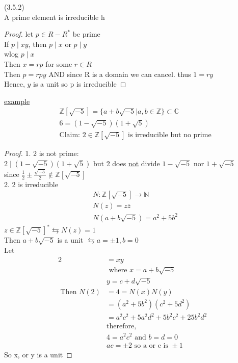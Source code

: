 \documentclass{article}
\begin{document}
\begin{proposition}(3.5.2) \leavevmode \\ 
    A prime element is irreducible
    h
    
\end{proposition}
\begin{proof}
    let $p \in R - R^*$ be prime \\ If $p \mid xy$, then $p \mid x$ or $p \mid y$ \\  wlog $p \mid x$
    \\ 
    Then $x = rp$ for some $r \in R$ \\ 
    Then $ p = rpy$ AND since R is a domain we can cancel. thus $1 = ry$ \\ 
    Hence, $y$ is a unit so p is irreducible 
\end{proof}
\underline{example} 
\begin{align*}
    &\mathbb{Z}[\sqrt{-5}] = \{a + b\sqrt{-5} | a, b \in \mathbb{Z}\} \subset \mathbb{C} \\ 
    & 6 = (1 - \sqrt{-5})(1 + \sqrt{5}) \\ 
    &\text{Claim: } 2 \in \mathbb{Z}[\sqrt{-5}] \text{ is irreducible but no prime}
\end{align*}
\begin{proof}
    1. 2 is not prime: \\ 
    $2 \mid (1 - \sqrt{-5})(1 + \sqrt{5})$ but 2 does \underline{not} divide $1 - \sqrt{-5}$ nor $1 + \sqrt{-5}$ \\ 
    since $\frac{1}{2} \pm \frac{\sqrt{-5}}{2} \not \in \mathbb{Z}[\sqrt{-5}]$ \\
    2. 2 is irreducible \begin{align*}
        &N : \mathbb{Z}[\sqrt{-5}] \rightarrow \mathbb{N } \\ 
        &N(z) = z\bar{z} \\ 
        &N (a + b\sqrt{-5}) = a^2 + 5b^2
    \end{align*}
    $z \in \mathbb{Z}[\sqrt{-5}]^* \leftrightarrows N(z) = 1$ \\ 
    Then $a + b \sqrt{-5}$ is a unit $\leftrightarrows a = \pm 1, b = 0$ \\ 
    Let \begin{align*}
        2 & = xy \\ 
        & \text{ where }  x = a + b \sqrt{-5} \\ 
        &y = c + d \sqrt{-5}\\ 
        \text{ Then } N(2) &= 4 = N(x) N(y) \\ 
        & = (a^2 + 5b^2) (c^2 + 5d^2) \\ 
        & = a^2c^2 + 5a^2d^2 + 5b^2c^2 + 25 b^2 d^2 \\ 
        &\text{therefore, } \\ 
        & 4 =a^2c^2 \text{ and } b = d= 0 \\ 
        & ac = \pm 2 \text{ so a or c is } \pm 1
    \end{align*}
    So x, or y is a unit
\end{proof}
\end{document}
